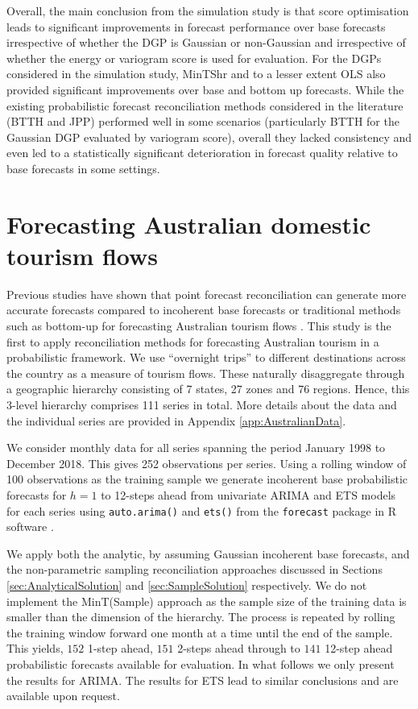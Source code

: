 \documentclass[12pt]{article}
\theoremstyle{definition}
\begin{document}
Overall, the main conclusion from the simulation study is that score optimisation leads to significant improvements in forecast performance over base forecasts irrespective of whether the DGP is Gaussian or non-Gaussian and irrespective of whether the energy or variogram score is used for evaluation.  For the DGPs considered in the simulation study, MinTShr and to a lesser extent OLS also provided significant improvements over base and bottom up forecasts.  While the existing probabilistic forecast reconciliation methods considered in the literature (BTTH and JPP) performed well in some scenarios (particularly BTTH for the Gaussian DGP evaluated by variogram score), overall they lacked consistency and even led to a statistically significant deterioration in forecast quality relative to base forecasts in some settings.

\section{Forecasting Australian domestic tourism flows}\label{sec:Application}

Previous studies have shown that point forecast reconciliation can generate more accurate forecasts compared to incoherent base forecasts or traditional methods such as bottom-up for forecasting Australian tourism flows \citep[see for example,][]{AthEtAl2009, HynEtAl2011, WicEtAl2019}. This study is the first to apply reconciliation methods for forecasting Australian tourism in a probabilistic framework. We use ``overnight trips'' to different destinations across the country as a measure of tourism flows. These naturally disaggregate through a geographic hierarchy consisting of 7 states, 27 zones and 76 regions. Hence, this 3-level hierarchy comprises 111 series in total. More details about the data and the individual series are provided in Appendix \ref{app:AustralianData}.

We consider monthly data for all series spanning the period January 1998 to December 2018. This gives 252 observations per series. Using a rolling window of 100 observations as the training sample we generate incoherent base probabilistic forecasts for $h=1$ to 12-steps ahead from univariate ARIMA and ETS models for each series using \verb|auto.arima()| and \verb|ets()| from the \verb|forecast| package \citep{Rforecast} in R software \citep{Rcore}.

We apply both the analytic, by assuming Gaussian incoherent base forecasts, and the non-parametric sampling reconciliation approaches discussed in Sections \ref{sec:AnalyticalSolution} and \ref{sec:SampleSolution} respectively. We do not implement the MinT(Sample) approach as the sample size of the training data is smaller than the dimension of the hierarchy. The process is repeated by rolling the training window forward one month at a time until the end of the sample. This yields, $152$ 1-step ahead, $151$ 2-steps ahead through to $141$ 12-step ahead probabilistic forecasts available for evaluation. In what follows we only present the results for ARIMA. The results for ETS lead to similar conclusions and are available upon request.
\end{document}
